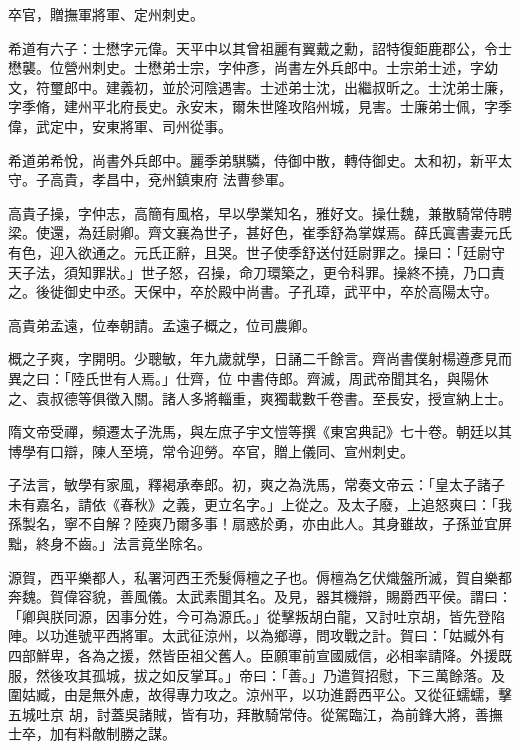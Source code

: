 \begin{pinyinscope}
 卒官，贈撫軍將軍、定州刺史。



 希道有六子：士懋字元偉。天平中以其曾祖麗有翼戴之勳，詔特復鉅鹿郡公，令士懋襲。位營州刺史。士懋弟士宗，字仲彥，尚書左外兵郎中。士宗弟士述，字幼文，符璽郎中。建義初，並於河陰遇害。士述弟士沈，出繼叔昕之。士沈弟士廉，字季脩，建州平北府長史。永安末，爾朱世隆攻陷州城，見害。士廉弟士佩，字季偉，武定中，安東將軍、司州從事。



 希道弟希悅，尚書外兵郎中。麗季弟騏驎，侍御中散，轉侍御史。太和初，新平太守。子高貴，孝昌中，兗州鎮東府
 法曹參軍。



 高貴子操，字仲志，高簡有風格，早以學業知名，雅好文。操仕魏，兼散騎常侍聘梁。使還，為廷尉卿。齊文襄為世子，甚好色，崔季舒為掌媒焉。薛氏寘書妻元氏有色，迎入欲通之。元氏正辭，且哭。世子使季舒送付廷尉罪之。操曰：「廷尉守天子法，須知罪狀。」世子怒，召操，命刀環築之，更令科罪。操終不撓，乃口責之。後徙御史中丞。天保中，卒於殿中尚書。子孔璋，武平中，卒於高陽太守。



 高貴弟孟遠，位奉朝請。孟遠子概之，位司農卿。



 概之子爽，字開明。少聰敏，年九歲就學，日誦二千餘言。齊尚書僕射楊遵彥見而異之曰：「陸氏世有人焉。」仕齊，位
 中書侍郎。齊滅，周武帝聞其名，與陽休之、袁叔德等俱徵入關。諸人多將輜重，爽獨載數千卷書。至長安，授宣納上士。



 隋文帝受禪，頻遷太子洗馬，與左庶子宇文愷等撰《東宮典記》七十卷。朝廷以其博學有口辯，陳人至境，常令迎勞。卒官，贈上儀同、宣州刺史。



 子法言，敏學有家風，釋褐承奉郎。初，爽之為洗馬，常奏文帝云：「皇太子諸子未有嘉名，請依《春秋》之義，更立名字。」上從之。及太子廢，上追怒爽曰：「我孫製名，寧不自解？陸爽乃爾多事！扇惑於勇，亦由此人。其身雖故，子孫並宜屏黜，終身不齒。」法言竟坐除名。



 源賀，西平樂都人，私署河西王禿髮傉檀之子也。傉檀為乞伏熾盤所滅，賀自樂都奔魏。賀偉容貌，善風儀。太武素聞其名。及見，器其機辯，賜爵西平侯。謂曰：「卿與朕同源，因事分姓，今可為源氏。」從擊叛胡白龍，又討吐京胡，皆先登陷陣。以功進號平西將軍。太武征涼州，以為鄉導，問攻戰之計。賀曰：「姑臧外有四部鮮卑，各為之援，然皆臣祖父舊人。臣願軍前宣國威信，必相率請降。外援既服，然後攻其孤城，拔之如反掌耳。」帝曰：「善。」乃遣賀招慰，下三萬餘落。及圍姑臧，由是無外慮，故得專力攻之。涼州平，以功進爵西平公。又從征蠕蠕，擊五城吐京
 胡，討蓋吳諸賊，皆有功，拜散騎常侍。從駕臨江，為前鋒大將，善撫士卒，加有料敵制勝之謀。




\end{pinyinscope}
